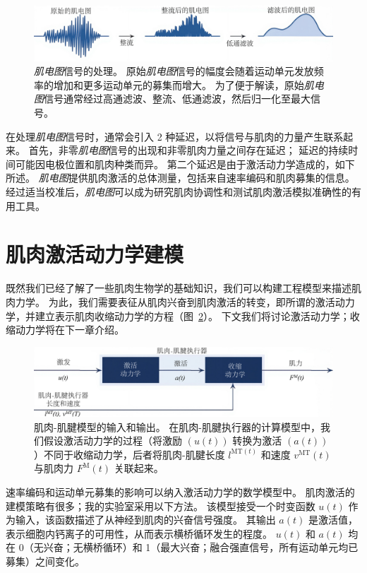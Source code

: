\begin{figure}[!htb]
	\centering
	\includegraphics[width=1.0\linewidth]{chap4/4_14}
	\caption{\textit{肌电图}信号的处理。
		原始\textit{肌电图}信号的幅度会随着运动单元发放频率的增加和更多运动单元的募集而增大。
		为了便于解读，原始\textit{肌电图}信号通常经过高通滤波、整流、低通滤波，然后归一化至最大信号。 \label{fig:4_14}}
\end{figure}


在处理\textit{肌电图}信号时，通常会引入 2 种延迟，以将信号与肌肉的力量产生联系起来。
首先，非零\textit{肌电图}信号的出现和非零肌肉力量之间存在延迟；
延迟的持续时间可能因电极位置和肌肉种类而异。
第二个延迟是由于激活动力学造成的，如下所述。
\textit{肌电图}提供肌肉激活的总体测量，包括来自速率编码和肌肉募集的信息。
经过适当校准后，\textit{肌电图}可以成为研究肌肉协调性和测试肌肉激活模拟准确性的有用工具。


\section{肌肉激活动力学建模}

既然我们已经了解了一些肌肉生物学的基础知识，我们可以构建工程模型来描述肌肉力学。
为此，我们需要表征从肌肉兴奋到肌肉激活的转变，即所谓的激活动力学，并建立表示肌肉收缩动力学的方程（图~\ref{fig:4_15}）。
下文我们将讨论激活动力学；收缩动力学将在下一章介绍。


\begin{figure}[!htb]
	\centering
	\includegraphics[width=1.0\linewidth]{chap4/4_15}
	\caption{肌肉-肌腱模型的输入和输出。
		在肌肉-肌腱执行器的计算模型中，我们假设激活动力学的过程（将激励 $(u(t))$  转换为激活 $(a(t))$）不同于收缩动力学，后者将肌肉-肌腱长度 $l^{\text{MT}(t)}$ 和速度 $v^{\text{MT}}(t)$ 与肌肉力 $F^{\text{M}}(t)$ 关联起来。 \label{fig:4_15}}
\end{figure}


速率编码和运动单元募集的影响可以纳入激活动力学的数学模型中。
肌肉激活的建模策略有很多；我的实验室采用以下方法。
该模型接受一个时变函数 $u(t)$ 作为输入，该函数描述了从神经到肌肉的兴奋信号强度。
其输出 $a(t)$ 是激活值，表示细胞内钙离子的可用性，从而表示横桥循环发生的程度。
$u(t)$ 和 $a(t)$ 均在 0（无兴奋；无横桥循环）和 1（最大兴奋；融合强直信号，所有运动单元均已募集）之间变化。


